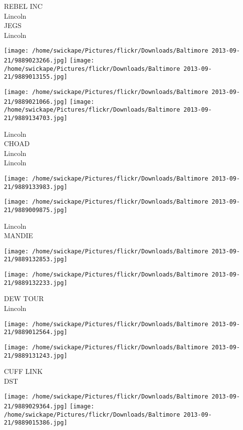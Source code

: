 \documentclass[10pt,letterpaper]{article}
\begin{document}
REBEL INC\\
Lincoln\\
JEGS\\
Lincoln\\
\pagebreak

\texttt{[image: /home/swickape/Pictures/flickr/Downloads/Baltimore 2013-09-21/9889023266.jpg]}
\texttt{[image: /home/swickape/Pictures/flickr/Downloads/Baltimore 2013-09-21/9889013155.jpg]}

\texttt{[image: /home/swickape/Pictures/flickr/Downloads/Baltimore 2013-09-21/9889021066.jpg]}
\texttt{[image: /home/swickape/Pictures/flickr/Downloads/Baltimore 2013-09-21/9889134703.jpg]}

Lincoln\\
CHOAD\\
Lincoln\\
Lincoln\\
\pagebreak

\texttt{[image: /home/swickape/Pictures/flickr/Downloads/Baltimore 2013-09-21/9889133983.jpg]}

\vspace{0.25in}
\texttt{[image: /home/swickape/Pictures/flickr/Downloads/Baltimore 2013-09-21/9889009875.jpg]}

Lincoln\\
MANDIE\\
\pagebreak

\texttt{[image: /home/swickape/Pictures/flickr/Downloads/Baltimore 2013-09-21/9889132853.jpg]}

\vspace{0.25in}
\texttt{[image: /home/swickape/Pictures/flickr/Downloads/Baltimore 2013-09-21/9889132233.jpg]}

DEW TOUR\\
Lincoln\\
\pagebreak

\texttt{[image: /home/swickape/Pictures/flickr/Downloads/Baltimore 2013-09-21/9889012564.jpg]}

\vspace{0.25in}
\texttt{[image: /home/swickape/Pictures/flickr/Downloads/Baltimore 2013-09-21/9889131243.jpg]}

CUFF LINK\\
DST\\
\pagebreak

\texttt{[image: /home/swickape/Pictures/flickr/Downloads/Baltimore 2013-09-21/9889029364.jpg]}
\texttt{[image: /home/swickape/Pictures/flickr/Downloads/Baltimore 2013-09-21/9889015386.jpg]}
\end{document}
